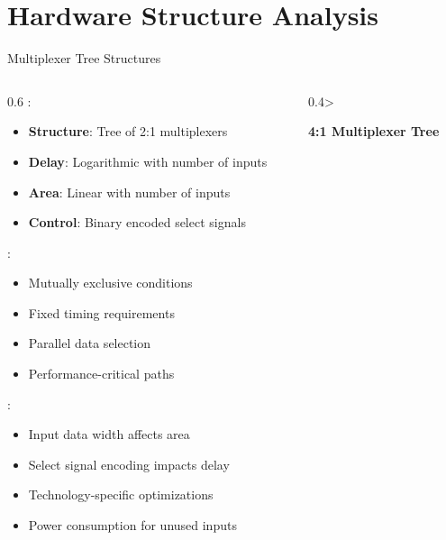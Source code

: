 \section{Hardware Structure Analysis}

\begin{frame}{Multiplexer Tree Structures}
\begin{columns}
\begin{column}{0.6\textwidth}
:
\begin{itemize}
\item \textbf{Structure}: Tree of 2:1 multiplexers
\item \textbf{Delay}: Logarithmic with number of inputs
\item \textbf{Area}: Linear with number of inputs
\item \textbf{Control}: Binary encoded select signals
\end{itemize}

\vspace{0.3cm}
:
\begin{itemize}
\item Mutually exclusive conditions
\item Fixed timing requirements
\item Parallel data selection
\item Performance-critical paths
\end{itemize}

\vspace{0.3cm}
:
\begin{itemize}
\item Input data width affects area
\item Select signal encoding impacts delay
\item Technology-specific optimizations
\item Power consumption for unused inputs
\end{itemize}
\end{column}
\begin{column}{0.4\textwidth>
\begin{center}
\textbf{4:1 Multiplexer Tree}
\vspace{0.3cm}

\end{center}}
\end{column}
\end{columns}
\end{frame}
